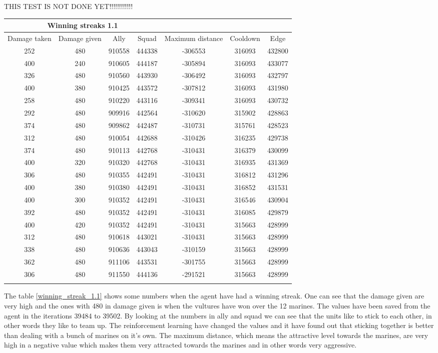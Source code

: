 
THIS TEST IS NOT DONE YET!!!!!!!!!!!!

\begin{centering}
 \begin{tabular}{|c|c|c|c|c|c|c|}
	\multicolumn{4}{c}{Winning streaks 1.1} \\
	\hline
	Damage taken & Damage given & Ally & Squad & Maximum distance & Cooldown & Edge \\
	\hline
	
	252&		480&			910558&	444338&	-306553&			316093&	432800\\
	400&		240&			910605&	444187&	-305894&			316093&	433077\\
	326&		480&			910560&	443930&	-306492&			316093&	432797\\
	400&		380&			910425&	443572&	-307812&			316093&	431980\\
	258&		480&			910220&	443116&	-309341&			316093&	430732\\
	292&		480&			909916&	442564&	-310620&			315902&	428863\\
	374&		480&			909862&	442487&	-310731&			315761&	428523\\
	312&		480&			910054&	442688&	-310426&			316235&	429738\\
	374&		480&			910113&	442768&	-310431&			316379&	430099\\
	400&		320&			910320&	442768&	-310431&			316935&	431369\\
	306&		480&			910355&	442491&	-310431&			316812&	431296\\
	400&		380&			910380&	442491&	-310431&			316852&	431531\\
	400&		300&			910352&	442491&	-310431&			316546&	430904\\
	392&		480&			910352&	442491&	-310431&			316085&	429879\\
	400&		420&			910352&	442491&	-310431&			315663&	428999\\
	312&		480&			910618&	443021&	-310431&			315663&	428999\\
	338&		480&			910636&	443043&	-310159&			315663&	428999\\
	362&		480&			911106&	443531&	-301755&			315663&	428999\\
	306&		480&			911550&	444136&	-291521&			315663&	428999\\
	\hline
	\label{winning_streak_1.1}
\end{tabular}
\end{centering}
The table \ref{winning_streak_1.1} shows some numbers when the agent have had a winning streak. One can see that the damage given are very high and the ones with 480 in damage given is when the vultures have won over the 12 marines. The values have been saved from the agent in the iterations 39484 to 39502. By looking at the numbers in ally and squad we can see that the units like to stick to each other, in other words they like to team up. The reinforcement learning have changed the values and it have found out that sticking together is better than dealing with a bunch of marines on it's own. The maximum distance, which means the attractive level towards the marines, are very high in a negative value which makes them very attracted towards the marines and in other words very aggressive. 
